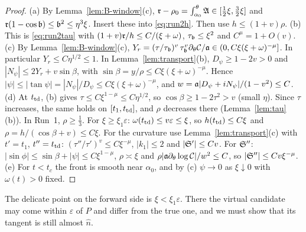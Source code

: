 \begin{proof}
(a) By Lemma~\ref{lem:B-window}(c), $\mathfrak{r}-\rho_0=\int_{\alpha_0}^\theta\mathfrak{A}\in[\frac12\xi,\frac32\xi]$ and
$\mathfrak{r}(1-\cos\mathfrak{b})\le\mathfrak{b}^2\le\eta^3\xi$. Insert these into \eqref{eq:run2h}. Then use $h\le(1+v)\rho$.
(b) This is \eqref{eq:run2tau} with $(1+v)\mathfrak{r}/h\le C/(\xi+\omega)$, $\tau_{\mathfrak{b}}\le\xi^2$ and $C^\mu=1+O(v)$.
(c) By Lemma~\ref{lem:B-window}(c), $Y_r=(\tau/\tau_{\mathfrak{b}})^v\,\tau_{\mathfrak{b}}^v\partial_\theta\mathcal C/\mathfrak{a}\in(0,C\xi(\xi+\omega)^{-\mu}]$. In
particular $Y_r\le C\eta^{1/2}\le1$. In Lemma~\ref{lem:transport}(b), $D_\psi\ge1-2v>0$ and $|N_\psi|\le2Y_r+v\sin\beta$, with
$\sin\beta=y/\rho\le C\xi(\xi+\omega)^{-\mu}$. Hence $|\psi|\le|\tan\psi|=|N_\psi|/D_\psi\le C\xi(\xi+\omega)^{-\mu}$, and
$w=\mathfrak{a}|D_\psi+iN_\psi|/(1-v^2)\le C$.
(d) At $t_{\mathrm{td}}$, (b) gives $\tau\le C\xi^{1-\mu}\le C\eta^{1/2}$, so $\cos\beta\ge1-2\tau^2>v$ (small $\eta$). Since $\tau$
increases, the same holds on $[t_1,t_{\mathrm{td}}]$, and $\rho$ decreases there (Lemma~\ref{lem:tau}(b)). In Run~1, $\rho\ge\frac13$. For
$\xi\ge\xi_1\varepsilon$: $\omega(t_{\mathrm{td}})\le v\varepsilon\le\xi$, so $h(t_{\mathrm{td}})\le C\xi$ and $\rho=h/(\cos\beta+v)\le C\xi$. For the
curvature use Lemma~\ref{lem:transport}(c) with $t'=t_1$, $t''=t_{\mathrm{td}}$: $(\tau''/\tau')^v\le C\xi^{-\mu}$, $|k_1|\le2$ and
$|\mathfrak{S}'|\le Cv$. For $\mathfrak{S}''$: $|\sin\phi|\le\sin\beta+|\psi|\le C\xi^{1-\mu}$, $\rho\asymp\xi$ and
$\rho|\mathfrak{a}\partial_\theta\log\mathcal C|/w^2\le C$, so $|\mathfrak{S}''|\le Cv\xi^{-\mu}$.
(e) For $t<t_c$ the front is smooth near $\alpha_0$, and by (c) $\psi\to0$ as $\xi\downarrow0$ with $\omega(t)>0$ fixed.
\end{proof}

The delicate point on the forward side is $\xi<\xi_1\varepsilon$. There the virtual candidate may come within $\varepsilon$ of
$P$ and differ from the true one, and we must show that its tangent is still almost $\hat n$.

